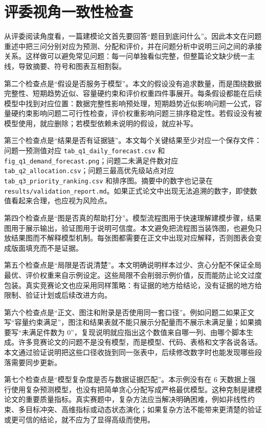 \documentclass[12pt]{ctexart}
\begin{document}
\section{评委视角一致性检查}

从评委阅读角度看，一篇建模论文首先要回答“题目到底问什么”。因此本文在问题重述中把三问分别对应为预测、分配和评价，并在问题分析中说明三问之间的承接关系。这样做可以避免常见问题：每一问单独看似完整，但整篇论文缺少统一主线，导致摘要、符号和图表互相割裂。

第二个检查点是“假设是否服务于模型”。本文的假设没有追求数量，而是围绕数据完整性、短期趋势近似、容量硬约束和评价权重四件事展开。每条假设都能在后续模型中找到对应位置：数据完整性影响预处理，短期趋势近似影响问题一公式，容量硬约束影响问题二可行性检查，评价权重影响问题三排序稳定性。若假设没有被模型使用，就应删除；若模型依赖未说明的假设，就应补写。

第三个检查点是“结果是否有证据链”。本文每个关键结果至少对应一个保存文件：问题一预测值对应 \texttt{tab\_q1\_daily\_forecast.csv} 和 \texttt{fig\_q1\_demand\_forecast.png}；问题二未满足件数对应 \texttt{tab\_q2\_allocation.csv}；问题三最高优先级站点对应 \texttt{tab\_q3\_priority\_ranking.csv} 和排序图。摘要中的数字也记录在 \texttt{results/validation\_report.md}。如果正式论文中出现无法追溯的数字，即使数值看起来合理，也应视为风险点。

第四个检查点是“图是否真的帮助打分”。模型流程图用于快速理解建模步骤，结果图用于展示输出，验证图用于说明可信度。本文避免把流程图当装饰图，也避免只放结果图而不解释模型机制。每张图都需要在正文中出现对应解释，否则图表会变成版面填充而不是证据。

第五个检查点是“局限是否说清楚”。本文明确说明样本过少、贪心分配不保证全局最优、评价权重来自示例设定。这些局限不会削弱示例价值，反而能防止论文过度包装。真实竞赛论文也应采用同样策略：有证据的地方给结论，没有证据的地方给限制、验证计划或后续改进方向。

第六个检查点是“正文、图注和附录是否使用同一套口径”。例如问题二如果正文写“容量约束满足”，图注和结果表就不能只展示分配量而不展示未满足量；如果摘要写“未满足件数为 0”，复现说明就应指出这个数值来自哪一列、由哪个脚本生成。许多竞赛论文的问题不是没有模型，而是模型、代码、表格和文字各说各话。本文通过验证说明把这些口径收拢到同一张表中，后续修改数字时也能发现哪些段落需要同步更新。

第七个检查点是“模型复杂度是否与数据证据匹配”。本示例没有在 6 天数据上强行使用复杂预测模型，也没有把简单贪心分配写成严格最优模型。这种克制是建模论文的重要质量指标。真实赛题中，复杂方法应当解决明确困难，例如非线性约束、多目标冲突、高维指标或动态状态演化；如果复杂方法不能带来更清楚的验证或更可信的结论，就不应为了显得高级而使用。
\end{document}
